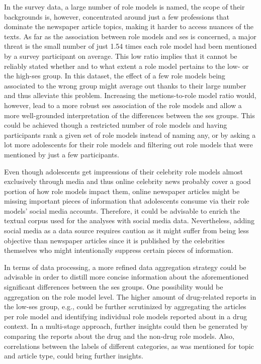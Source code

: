 In the survey data, a large number of role models is named, the scope of their backgrounds is, however, concentrated around just a few professions that dominate the newspaper article topics, making it harder to access nuances of the texts. As far as the association between role models and \gls{ses} is concerned, a major threat is the small number of just \SI{1.54}{} times each role model had been mentioned by a survey participant on average. This low ratio implies that it cannot be reliably stated whether and to what extent a role model pertains to the low- or the high-\gls{ses} group. In this dataset, the effect of a few role models being associated to the wrong group might average out thanks to their large number and thus alleviate this problem. Increasing the metions-to-role model ratio would, however, lead to a more robust \gls{ses} association of the role models and allow a more well-grounded interpretation of the differences between the \gls{ses} groups. This could be achieved though a restricted number of role models and having participants rank a given set of role models instead of naming any, or by asking a lot more adolescents for their role models and filtering out role models that were mentioned by just a few participants.

Even though adolescents get impressions of their celebrity role models almost exclusively through media and thus online celebrity news probably cover a good portion of how role models impact them, online newspaper articles might be missing important pieces of information that adolescents consume via their role models' social media accounts. Therefore, it could be advisable to enrich the textual corpus used for the analyses with social media data. Nevertheless, adding social media as a data source requires caution as it might suffer from being less objective than newspaper articles since it is published by the celebrities themselves who might intentionally suppress certain pieces of information.

In terms of data processing, a more refined data aggregation strategy could be advisable in order to distill more concise information about the aforementioned significant differences between the \gls{ses} groups. One possibility would be aggregation on the role model level. The higher amount of drug-related reports in the low-\gls{ses} group, e.g., could be further scrutinized by aggregating the articles per role model and identifying individual role models reported about in a drug context. In a multi-stage approach, further insights could then be generated by comparing the reports about the drug and the non-drug role models. Also, correlations between the labels of different categories, as was mentioned for topic and article type, could bring further insights.

